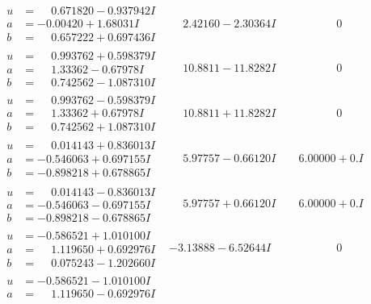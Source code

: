 \documentclass[1p]{elsarticle_modified}
\theoremstyle{definition}
\begin{document}
$$\begin{array}{c|c|c}
\begin{aligned}
u &= \phantom{-}0.671820 - 0.937942 I \\
a &= -0.00420 + 1.68031 I \\
b &= \phantom{-}0.657222 + 0.697436 I\end{aligned}
 & \phantom{-}2.42160 - 2.30364 I & \phantom{-0.000000 } 0 \\ \hline\begin{aligned}
u &= \phantom{-}0.993762 + 0.598379 I \\
a &= \phantom{-}1.33362 - 0.67978 I \\
b &= \phantom{-}0.742562 - 1.087310 I\end{aligned}
 & \phantom{-}10.8811 - 11.8282 I & \phantom{-0.000000 } 0 \\ \hline\begin{aligned}
u &= \phantom{-}0.993762 - 0.598379 I \\
a &= \phantom{-}1.33362 + 0.67978 I \\
b &= \phantom{-}0.742562 + 1.087310 I\end{aligned}
 & \phantom{-}10.8811 + 11.8282 I & \phantom{-0.000000 } 0 \\ \hline\begin{aligned}
u &= \phantom{-}0.014143 + 0.836013 I \\
a &= -0.546063 + 0.697155 I \\
b &= -0.898218 + 0.678865 I\end{aligned}
 & \phantom{-}5.97757 - 0.66120 I & \phantom{-}6.00000 + 0. I\phantom{ +0.000000I} \\ \hline\begin{aligned}
u &= \phantom{-}0.014143 - 0.836013 I \\
a &= -0.546063 - 0.697155 I \\
b &= -0.898218 - 0.678865 I\end{aligned}
 & \phantom{-}5.97757 + 0.66120 I & \phantom{-}6.00000 + 0. I\phantom{ +0.000000I} \\ \hline\begin{aligned}
u &= -0.586521 + 1.010100 I \\
a &= \phantom{-}1.119650 + 0.692976 I \\
b &= \phantom{-}0.075243 - 1.202660 I\end{aligned}
 & -3.13888 - 6.52644 I & \phantom{-0.000000 } 0 \\ \hline\begin{aligned}
u &= -0.586521 - 1.010100 I \\
a &= \phantom{-}1.119650 - 0.692976 I \\

\end{aligned}
\end{array}$$
\end{document}
